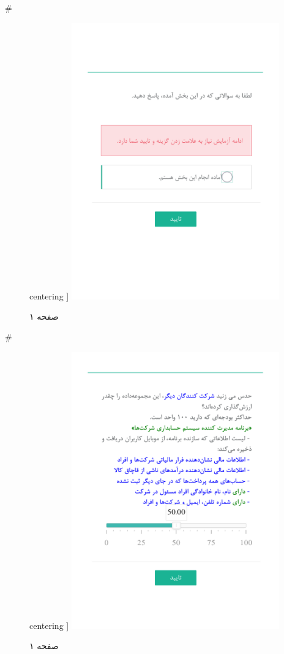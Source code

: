 { 
 # 
\begin{figure}[htpb]
centering ]
\includegraphics[width=0.8\textwidth]{./img/Task5.png/}
\caption{صفحه ۱}
\label{fig:Task1}
\end{figure}
 
 
 # 
\begin{figure}[htpb]
centering ]
\includegraphics[width=0.8\textwidth]{./img/Task60.png/}
\caption{صفحه ۱}
\label{fig:Task1}
\end{figure}
 
}
